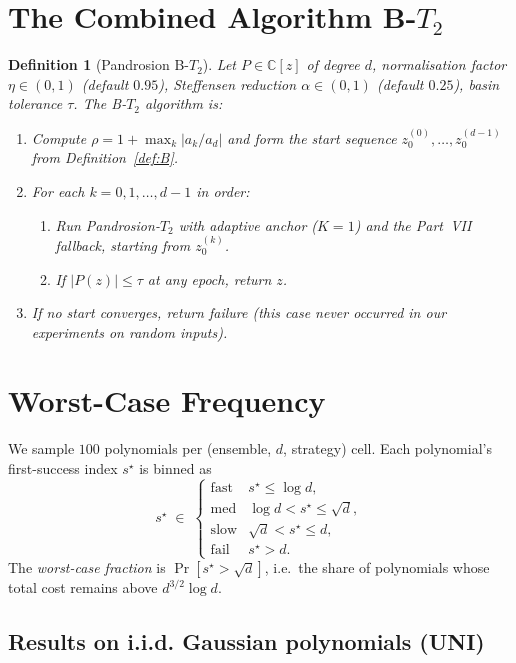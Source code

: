 \documentclass[11pt,a4paper]{article}
\newtheorem{definition}[theorem]{Definition}
\begin{document}
\section{The Combined Algorithm B-$T_2$}

\begin{definition}[Pandrosion B-$T_2$]\label{def:BT2}
Let $P \in \mathbb{C}[z]$ of degree $d$, normalisation factor $\eta \in (0,1)$ (default $0.95$), Steffensen reduction $\alpha \in (0,1)$ (default $0.25$), basin tolerance $\tau$. The B-$T_2$ algorithm is:
\begin{enumerate}
\item Compute $\rho = 1 + \max_k |a_k/a_d|$ and form the start sequence $z_0^{(0)}, \dots, z_0^{(d-1)}$ from Definition~\ref{def:B}.
\item For each $k = 0, 1, \dots, d-1$ in order:
\begin{enumerate}
\item Run Pandrosion-$T_2$ with adaptive anchor ($K = 1$) and the Part~VII fallback, starting from $z_0^{(k)}$.
\item If $|P(z)| \le \tau$ at any epoch, return $z$.
\end{enumerate}
\item If no start converges, return failure (this case never occurred in our experiments on random inputs).
\end{enumerate}
\end{definition}

\section{Worst-Case Frequency}\label{sec:freq}

We sample $100$ polynomials per (ensemble, $d$, strategy) cell. Each polynomial's first-success index $s^\star$ is binned as
$$ s^\star \;\in\; \begin{cases} \text{fast} & s^\star \le \log d, \\ \text{med} & \log d < s^\star \le \sqrt d, \\ \text{slow} & \sqrt d < s^\star \le d, \\ \text{fail} & s^\star > d. \end{cases} $$
The \emph{worst-case fraction} is $\Pr[s^\star > \sqrt d]$, i.e.\ the share of polynomials whose total cost remains above $d^{3/2} \log d$.

\subsection{Results on i.i.d. Gaussian polynomials (UNI)}
\end{document}
